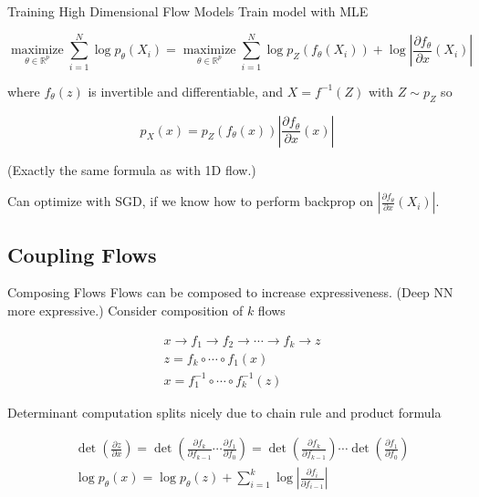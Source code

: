 \begin{frame}[allowframebreaks]

\begin{mydefinitionblock}{10.19}{Training High Dimensional Flow Models}
    Train model with MLE

    $$
    \underset{\theta \in \mathbb{R}^{p}}{\operatorname{maximize}} \sum_{i=1}^{N} \log p_{\theta}\left(X_{i}\right)=\underset{\theta \in \mathbb{R}^{p}}{\operatorname{maximize}} \sum_{i=1}^{N} \log p_{Z}\left(f_{\theta}\left(X_{i}\right)\right)+\log \left|\frac{\partial f_{\theta}}{\partial x}\left(X_{i}\right)\right|
    $$

    where $f_{\theta}(z)$ is invertible and differentiable, and $X=f^{-1}(Z)$ with $Z \sim p_{Z}$ so

    $$
    p_{X}(x)=p_{Z}\left(f_{\theta}(x)\right)\left|\frac{\partial f_{\theta}}{\partial x}(x)\right|
    $$

    (Exactly the same formula as with 1D flow.)

    Can optimize with SGD, if we know how to perform backprop on $\left|\frac{\partial f_{\theta}}{\partial x}\left(X_{i}\right)\right|$.
\end{mydefinitionblock}

\end{frame}

\subsection{Coupling Flows}

\begin{frame}[allowframebreaks]

\begin{myconceptblock}{10.20}{Composing Flows}
    Flows can be composed to increase expressiveness. (Deep NN more expressive.)
    Consider composition of $k$ flows

    $$
    \begin{aligned}
    & x \rightarrow f_{1} \rightarrow f_{2} \rightarrow \cdots \rightarrow f_{k} \rightarrow z \\
    & z=f_{k} \circ \cdots \circ f_{1}(x) \\
    & x=f_{1}^{-1} \circ \cdots \circ f_{k}^{-1}(z)
    \end{aligned}
    $$

    Determinant computation splits nicely due to chain rule and product formula

    $$
    \begin{aligned}
    & \operatorname{det}\left(\frac{\partial z}{\partial x}\right)=\operatorname{det}\left(\frac{\partial f_{k}}{\partial f_{k-1}} \cdots \frac{\partial f_{1}}{\partial f_{0}}\right)=\operatorname{det}\left(\frac{\partial f_{k}}{\partial f_{k-1}}\right) \cdots \operatorname{det}\left(\frac{\partial f_{1}}{\partial f_{0}}\right) \\
    & \log p_{\theta}(x)=\log p_{\theta}(z)+\sum_{i=1}^{k} \log \left|\frac{\partial f_{i}}{\partial f_{i-1}}\right|
    \end{aligned}
    $$
\end{myconceptblock}

\end{frame}

